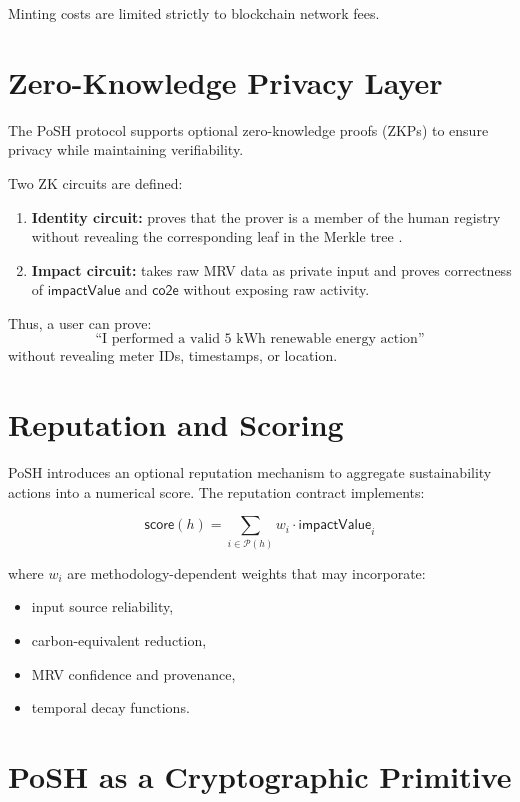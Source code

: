 \documentclass[11pt,a4paper]{report}
\theoremstyle{definition}
\theoremstyle{remark}
\begin{document}
Minting costs are limited strictly to blockchain network fees.

\section{Zero-Knowledge Privacy Layer}

The PoSH protocol supports optional zero-knowledge proofs (ZKPs) to ensure
privacy while maintaining verifiability.

Two ZK circuits are defined:

\begin{enumerate}[label=\arabic*.,leftmargin=*]
    \item \textbf{Identity circuit:}
    proves that the prover is a member of the human registry without revealing
    the corresponding leaf in the Merkle tree \cite{benSasson2014zkSNARK}.

    \item \textbf{Impact circuit:}
    takes raw MRV data as private input and proves correctness of
    \(\mathsf{impactValue}\) and \(\mathsf{co2e}\) without exposing raw activity.
\end{enumerate}

Thus, a user can prove:
\[
\text{``I performed a valid 5 kWh renewable energy action''}
\]
without revealing meter IDs, timestamps, or location.

\section{Reputation and Scoring}

PoSH introduces an optional reputation mechanism to aggregate sustainability
actions into a numerical score. The reputation contract implements:

\[
\mathsf{score}(h) = \sum_{i \in \mathcal{P}(h)} w_i \cdot \mathsf{impactValue}_i
\]

where \(w_i\) are methodology-dependent weights that may incorporate:

\begin{itemize}[leftmargin=*]
    \item input source reliability,
    \item carbon-equivalent reduction,
    \item MRV confidence and provenance,
    \item temporal decay functions.
\end{itemize}

\section{PoSH as a Cryptographic Primitive}
\end{document}
